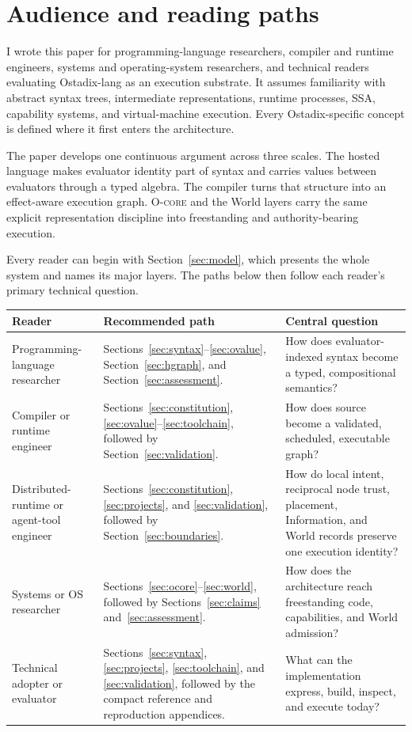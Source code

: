 \documentclass[11pt,oneside]{article}
\newcommand{\ocore}{\textsc{O-core}}
\begin{document}
\section*{Audience and reading paths}

I wrote this paper for programming-language researchers, compiler and runtime
engineers, systems and operating-system researchers, and technical readers
evaluating Ostadix-lang as an execution substrate. It assumes familiarity with
abstract syntax trees, intermediate representations, runtime processes, SSA,
capability systems, and virtual-machine execution. Every Ostadix-specific
concept is defined where it first enters the architecture.

The paper develops one continuous argument across three scales. The hosted
language makes evaluator identity part of syntax and carries values between
evaluators through a typed algebra. The compiler turns that structure into an
effect-aware execution graph. \ocore{} and the World layers carry the same
explicit representation discipline into freestanding and authority-bearing
execution.

Every reader can begin with Section~\ref{sec:model}, which presents the whole
system and names its major layers. The paths below then follow each reader's
primary technical question.

\begin{longtable}{P{0.22\textwidth} P{0.41\textwidth} P{0.29\textwidth}}
\toprule
\textbf{Reader} & \textbf{Recommended path} & \textbf{Central question} \\
\midrule
\endhead
Programming-language researcher &
Sections~\ref{sec:syntax}--\ref{sec:ovalue}, Section~\ref{sec:hgraph}, and
Section~\ref{sec:assessment}. &
How does evaluator-indexed syntax become a typed, compositional semantics? \\
Compiler or runtime engineer &
Sections~\ref{sec:constitution}, \ref{sec:ovalue}--\ref{sec:toolchain}, followed by
Section~\ref{sec:validation}. &
How does source become a validated, scheduled, executable graph? \\
Distributed-runtime or agent-tool engineer &
Sections~\ref{sec:constitution}, \ref{sec:projects}, and
\ref{sec:validation}, followed by Section~\ref{sec:boundaries}. &
How do local intent, reciprocal node trust, placement, Information, and World
records preserve one execution identity? \\
Systems or OS researcher &
Sections~\ref{sec:ocore}--\ref{sec:world}, followed by
Sections~\ref{sec:claims} and~\ref{sec:assessment}. &
How does the architecture reach freestanding code, capabilities, and World
admission? \\
Technical adopter or evaluator &
Sections~\ref{sec:syntax}, \ref{sec:projects}, \ref{sec:toolchain}, and
\ref{sec:validation}, followed by the compact reference and reproduction
appendices. &
What can the implementation express, build, inspect, and execute today? \\
\bottomrule
\end{longtable}
\end{document}
